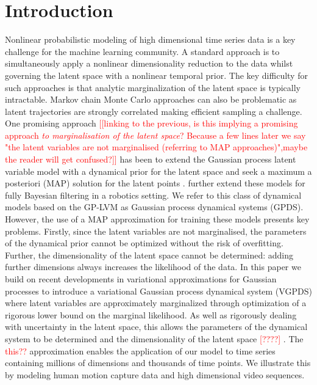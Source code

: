 \documentclass{article} %
\begin{document}
\section{Introduction}

Nonlinear probabilistic modeling of high dimensional time series data
is a key challenge for the machine learning community. A standard
approach is to simultaneously apply a nonlinear dimensionality
reduction to the data whilst governing the latent space with a
nonlinear temporal prior. The key difficulty for such approaches is
that analytic marginalization of the latent space is typically
intractable. Markov chain Monte Carlo approaches can also be
problematic as latent trajectories are strongly correlated making
efficient sampling a challenge. One promising approach
%
%
\textcolor{red}{[[linking to the previous, is this implying a promising approach
 \textit{to marginalisation of the latent space}? Because a few lines later we say
 "the latent variables are not marginalised (referring to MAP approaches)",maybe the reader will get confused?]]}
%
%
 has been to
extend the Gaussian process latent variable model
\cite{GPLVM,GPLVM2} with a dynamical
prior for the latent space and seek a maximum a posteriori (MAP)
solution for the latent points
\cite{GPDM,Wang:gpdm08,hgplvm}. \cite{GP-Based} further extend 
these models for fully Bayesian filtering in a robotics setting. We
refer to this class of dynamical models based on the GP-LVM as
Gaussian process dynamical systems (GPDS). However, the use of a MAP
approximation for training these models presents key problems.
 Firstly, since the latent variables are not marginalised, the parameters
 of the dynamical prior cannot be optimized without the risk of overfitting.
Further, the dimensionality of the latent space cannot be
determined: adding further dimensions always increases the likelihood
of the data. In this paper we build on recent developments in
variational approximations for Gaussian processes
\cite{Titsias09,BayesianGPLVM} to introduce a variational
Gaussian process dynamical system (VGPDS) where latent variables are
approximately marginalized through optimization of a rigorous lower
bound on the marginal likelihood. 
 As well as rigorously dealing with
uncertainty in the latent space, this allows the parameters of the
dynamical system to be determined and the dimensionality of the latent
space \textcolor{red}{[????]}
. The \textcolor{red}{this??} approximation enables the application of our model to time
series containing millions of dimensions and thousands of time
points. We illustrate this by modeling human motion capture data
and high dimensional video sequences.
\end{document}
